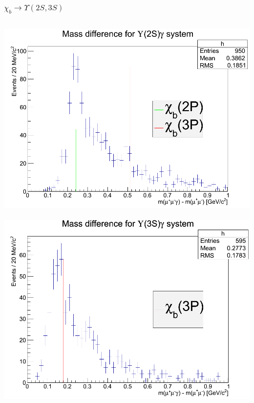 \documentclass{beamer}
\begin{document}
\begin{frame}
\frametitle{$\chi_{b} \rightarrow \Upsilon(2S,3S)$}
\begin{columns}[T]
\includegraphics[width=.9\textwidth]{images/chibY2S.png}\\~\\
\includegraphics[width=.9\textwidth]{images/chibY3S.png}\\~\\
\end{columns}
\end{frame}
\end{document}
